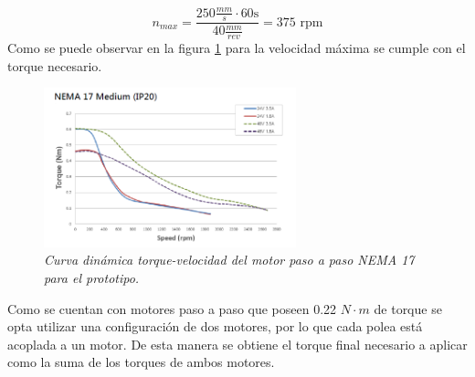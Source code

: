 \begin{equation}
    n_{max} = \frac{250 \frac{mm}{s} \cdot 60 \text {s}}{40 \frac{mm}{rev}} = 375 \text{ rpm}
\end{equation}
Como se puede observar en la figura \ref{fig:Curva_din_nema17medium} para la velocidad máxima se cumple con el torque necesario.
\begin{figure}[H]
    \centering
    \includegraphics[width=0.65\textwidth]{img/nema17_medium.png}
    \caption{\textit{Curva dinámica torque-velocidad del motor paso a paso NEMA 17 para el prototipo.}}
    \label{fig:Curva_din_nema17medium}
\end{figure}
Como se cuentan con motores paso a paso que poseen 0.22 $N \cdot m$ de torque se opta utilizar una configuración de dos motores, por lo que cada polea está acoplada a un motor. De esta manera se obtiene el torque final necesario a aplicar como la suma de los torques de ambos motores.